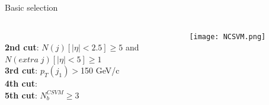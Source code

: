 \begin{frame}{Basic selection}
\vspace{-.2cm}

\begin{columns}
\begin{column}{.50\textwidth}
\begin{block}{}\scriptsize
{}\\
\textbf{2nd cut}: $N(j)[|\eta|<2.5]\ge 5$ and \\
\hspace{1.1cm} $N(extra\; j)[|\eta|<5]\ge 1$\\
\textbf{3rd cut}: $p_{T}(j_{1})>$150 GeV/c\\
\textbf{4th cut}: \\
\textbf{5th cut}: $N^{CSVM}_{b}\ge 3$
\end{block}
\end{column}

\begin{column}{.50\textwidth}
\begin{figure}[!Hhtbp]
  \begin{center}
    \texttt{[image: NCSVM.png]}
  \end{center}
\end{figure}
\end{column}

\end{columns}

\end{frame}

